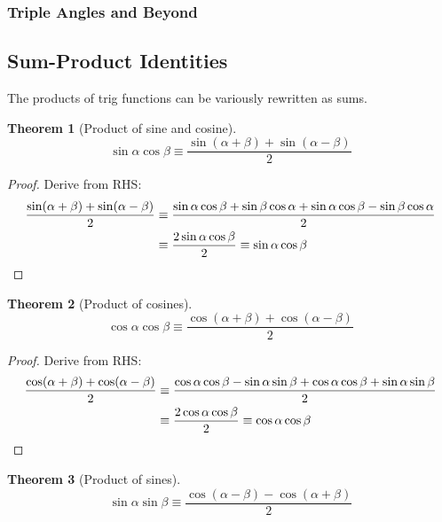 \documentclass[fleqn,a4paper,11pt]{article}
\newtheorem{theorem}{Theorem}[section]
\begin{document}
    \subsubsection{Triple Angles and Beyond}

    \subsection{Sum-Product Identities} \label{sec_trig_sum_product}

    The products of trig functions can be variously rewritten as sums.

    \begin{theorem}[Product of sine and cosine]
    \begin{equation*}
    \sin \alpha \cos \beta \equiv
        \frac{\sin(\alpha + \beta) + \sin(\alpha - \beta)} 2
    \end{equation*}
    \end{theorem}
    \begin{proof}
    Derive from RHS:
    \begin{align*}
    \frac{\sin(\alpha + \beta) + \sin(\alpha - \beta)} 2 &\equiv
     \frac{\sin \alpha \cos \beta + \sin \beta \cos \alpha +
           \sin \alpha \cos \beta - \sin \beta \cos \alpha} 2 \\
    &\equiv \frac{2 \sin \alpha \cos \beta} 2 \equiv \sin \alpha \cos \beta
        \qedhere
    \end{align*}
    \end{proof}
    \begin{theorem}[Product of cosines]
    \begin{equation*}
    \cos \alpha \cos \beta \equiv
     \frac{\cos(\alpha + \beta) + \cos(\alpha - \beta)} 2
    \end{equation*}
    \end{theorem}
    \begin{proof}
    Derive from RHS:
    \begin{align*}
    \frac{\cos(\alpha + \beta) + \cos(\alpha - \beta)} 2 &\equiv
     \frac{\cos \alpha \cos \beta - \sin \alpha \sin \beta +
           \cos \alpha \cos \beta + \sin \alpha \sin \beta} 2 \\
    &\equiv \frac{2 \cos \alpha \cos \beta} 2 \equiv \cos \alpha \cos \beta
        \qedhere
    \end{align*}
    \end{proof}
    \begin{theorem}[Product of sines]
    \begin{equation*}
    \sin \alpha \sin \beta \equiv
     \frac{\cos(\alpha - \beta) - \cos(\alpha + \beta)} 2
    \end{equation*}
    \end{theorem}
\end{document}
